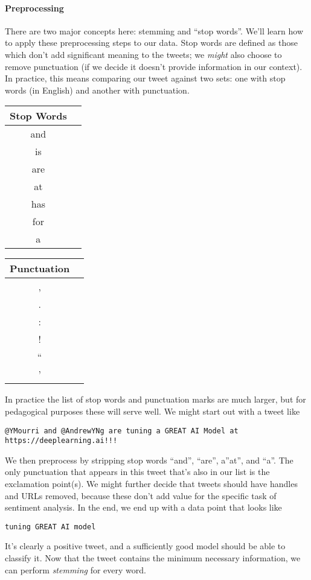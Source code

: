 \documentclass[12pt]{article}
\begin{document}
\paragraph{Preprocessing} There are two major concepts here: stemming and ``stop words''. We'll learn how to apply these preprocessing steps to our data. Stop words are defined as those which don't add significant meaning to the tweets; we \emph{might} also choose to remove punctuation (if we decide it doesn't provide information in our context). In practice, this means comparing our tweet against two sets: one with stop words (in English) and another with punctuation. 

\begin{minipage}{1.0\textwidth}
  \begin{multicols}{2}
      \begin{tabular}{c c}
        \hline
        Stop Words \\
        \hline
        and \\
        is \\
        are \\
        at \\
        has \\
        for \\
        a \\
      \end{tabular}
    \vfill\null \columnbreak  
    \begin{tabular}{c c}
      \hline
      Punctuation \\
      \hline
      , \\
      . \\
      : \\
      ! \\
      `` \\
      ' \\
    \end{tabular}
\end{multicols}
\end{minipage}
In practice the list of stop words and punctuation marks are much larger, but for pedagogical purposes these will serve well.
We might start out with a tweet like
\begin{verbatim}
@YMourri and @AndrewYNg are tuning a GREAT AI Model at https://deeplearning.ai!!!
\end{verbatim}
We then preprocess by stripping stop words ``and'', ``are'', a''at'', and ``a''. The only punctuation that appears in this tweet that's also in our list is the exclamation point(s). We might further decide that tweets should have handles and URLs removed, because these don't add value for the specific task of sentiment analysis. In the end, we end up with a data point that looks like
\begin{verbatim}
tuning GREAT AI model
\end{verbatim}
It's clearly a positive tweet, and a sufficiently good model should be able to classify it. Now that the tweet contains the minimum necessary information, we can perform \emph{stemming} for every word.
\end{document}
